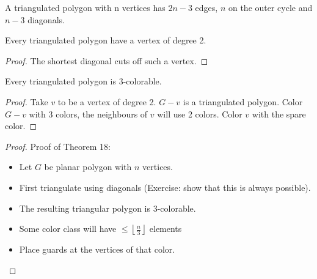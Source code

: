 \begin{observation}
A triangulated polygon with n vertices has $2n-3$ edges, $n$ on the outer cycle and $n-3$ diagonals.
\end{observation}

\begin{observation}
Every triangulated polygon have a vertex of degree 2.
\end{observation}
\begin{proof}
The shortest diagonal cuts off such a vertex.
\end{proof}

\begin{observation}
Every triangulated polygon is 3-colorable.
\end{observation}
\begin{proof}
Take $v$ to be a vertex of degree 2. $G-v$ is a triangulated polygon. Color $G-v$ with 3 colors, the neighbours of $v$ will use 2 colors. Color $v$ with the spare color.
\end{proof}

\begin{proof}
Proof of Theorem 18:

\begin{itemize}
\item Let $G$ be planar polygon with $n$ vertices.
\item First triangulate using diagonals (Exercise: show that this is always possible).
\item The resulting triangular polygon is 3-colorable. 
\item Some color class will have $\leq \left \lfloor \frac{n}{3} \right \rfloor$ elements
\item Place guards at the vertices of that color.
\end{itemize}
\end{proof}
